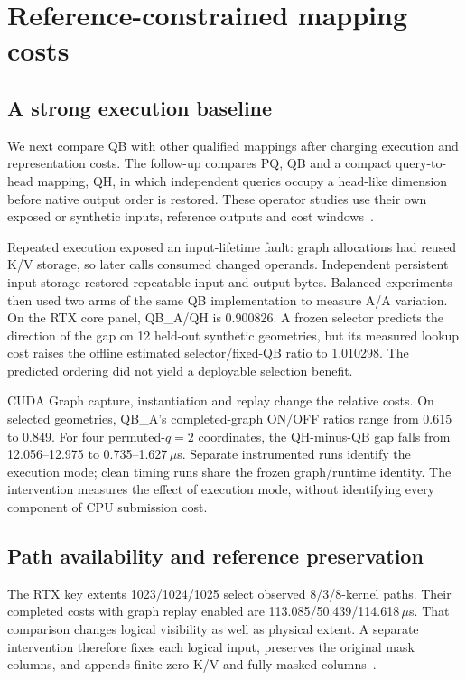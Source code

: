 \section{Reference-constrained mapping costs}
\label{sec:mappingcosts}
\subsection{A strong execution baseline}
We next compare QB with other qualified mappings after charging execution and representation costs. The follow-up compares PQ, QB and a compact query-to-head mapping, QH, in which independent queries occupy a head-like dimension before native output order is restored. These operator studies use their own exposed or synthetic inputs, reference outputs and cost windows~\cite{mappingrecords,b570compactrecords}.

Repeated execution exposed an input-lifetime fault: graph allocations had reused K/V storage, so later calls consumed changed operands. Independent persistent input storage restored repeatable input and output bytes. Balanced experiments then used two arms of the same QB implementation to measure A/A variation. On the RTX core panel, QB\_A/QH is 0.900826. A frozen selector predicts the direction of the gap on 12 held-out synthetic geometries, but its measured lookup cost raises the offline estimated selector/fixed-QB ratio to 1.010298. The predicted ordering did not yield a deployable selection benefit.

CUDA Graph capture, instantiation and replay change the relative costs. On selected geometries, QB\_A's completed-graph ON/OFF ratios range from 0.615 to 0.849. For four permuted-$q=2$ coordinates, the QH-minus-QB gap falls from 12.056--12.975 to 0.735--1.627\,$\mu$s. Separate instrumented runs identify the execution mode; clean timing runs share the frozen graph/runtime identity. The intervention measures the effect of execution mode, without identifying every component of CPU submission cost.

\subsection{Path availability and reference preservation}
The RTX key extents 1023/1024/1025 select observed 8/3/8-kernel paths. Their completed costs with graph replay enabled are 113.085/50.439/114.618\,$\mu$s. That comparison changes logical visibility as well as physical extent. A separate intervention therefore fixes each logical input, preserves the original mask columns, and appends finite zero K/V and fully masked columns~\cite{mappingrecords}.

